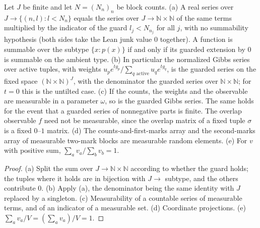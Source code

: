 \begin{lemma}\label{lem:sg:pd-guarded}
  \leanok
  Let $J$ be finite and let $N=(N_n)_n$ be block counts. (a) A real series over $J\to\{(n,l):l<N_n\}$ equals the series over $J\to\mathbb N\times\mathbb N$ of the same terms multiplied by the indicator of the guard $l_j<N_{n_j}$ for all $j$, with no summability hypothesis (both sides take the Lean junk value $0$ together). A function is summable over the subtype $\{x:p(x)\}$ if and only if its guarded extension by $0$ is summable on the ambient type. (b) In particular the normalized Gibbs series over active tuples, with weights $u_p e^{tg_p}/\sum_{q\text{ active}}u_qe^{tg_q}$, is the guarded series on the fixed space $(\mathbb N\times\mathbb N)^J$, with the denominator the guarded series over $\mathbb N\times\mathbb N$; for $t=0$ this is the untilted case. (c) If the counts, the weights and the observable are measurable in a parameter $\omega$, so is the guarded Gibbs series. The same holds for the event that a guarded series of nonnegative parts is finite. The overlap observable $f$ need not be measurable, since the overlap matrix of a fixed tuple $\sigma$ is a fixed $0$--$1$ matrix. (d) The counts-and-first-marks array and the second-marks array of measurable two-mark blocks are measurable random elements. (e) For $v$ with positive sum, $\sum_a v_a/\sum_bv_b=1$.
\end{lemma}

\begin{proof}
  \leanok
(a) Split the sum over $J\to\mathbb N\times\mathbb N$ according to whether the guard holds; the tuples where it holds are in bijection with $J\to$ subtype, and the others contribute $0$. (b) Apply (a), the denominator being the same identity with $J$ replaced by a singleton. (c) Measurability of a countable series of measurable terms, and of an indicator of a measurable set. (d) Coordinate projections. (e) $\sum_a v_a/V=(\sum_av_a)/V=1$.
\end{proof}

